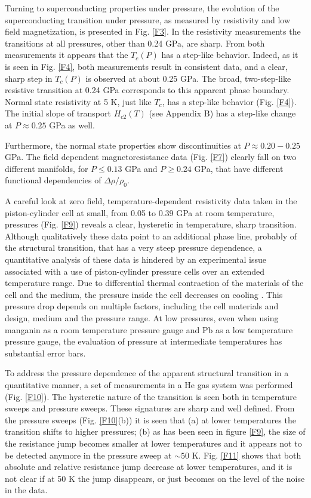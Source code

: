 \documentclass[aps,prb,preprint,groupedaddress,showpacs,amsmath,amssymb]{revtex4}
\begin{document}
Turning to superconducting properties under pressure, the evolution of the superconducting transition under pressure, as measured by resistivity and low field magnetization, is presented in Fig. \ref{F3}. In the resistivity measurements the transitions at all pressures, other than 0.24 GPa, are sharp. From both measurements it appears that the $T_c(P)$  has a step-like behavior. Indeed, as it is seen in Fig. \ref{F4}, both measurements result in consistent data, and a clear, sharp step in $T_c(P)$ is observed at about 0.25 GPa.  The broad, two-step-like resistive transition at 0.24 GPa corresponds to this apparent phase boundary. Normal state resistivity at 5 K, just like $T_c$, has a step-like behavior (Fig. \ref{F4}). The initial slope of transport $H_{c2}(T)$ (see Appendix B) has a step-like change at $P \approx 0.25$ GPa as well.

Furthermore, the normal state properties show discontinuities at $P \approx 0.20-0.25$ GPa. The field dependent magnetoresistance data (Fig. \ref{F7}) clearly fall on two different manifolds, for $P\leq 0.13$ GPa and $P \geq 0.24$ GPa, that have different functional dependencies of $\Delta \rho/\rho_0$. 

A careful look at zero field, temperature-dependent resistivity data taken in the piston-cylinder cell at small, from 0.05 to 0.39 GPa at room temperature, pressures (Fig. \ref{F9}) reveals a clear, hysteretic in temperature, sharp transition. Although qualitatively these data point to an additional phase line, probably of the structural transition, that has a very steep pressure dependence, a quantitative analysis of these data is hindered by an experimental issue associated with a use of piston-cylinder pressure cells over an extended temperature range. Due to differential thermal contraction of the materials of the cell and the medium, the pressure inside the cell decreases on cooling \cite{tho84a}. This pressure drop depends on multiple factors, including the cell materials and design, medium and the pressure range. At low pressures, even when using manganin as a room temperature pressure gauge and Pb as a low temperature pressure gauge, the evaluation of pressure at intermediate temperatures has substantial error bars. 

To address the pressure dependence of the apparent structural transition in a quantitative manner, a set of measurements in a He gas system was performed (Fig. \ref{F10}). The hysteretic nature of the transition is seen both in temperature sweeps and pressure sweeps. These signatures are sharp and well defined. From the pressure sweeps (Fig. \ref{F10}(b))  it is seen that (a) at lower temperatures the transition shifts to higher pressures; (b) as has been seen in figure \ref{F9}, the size of the resistance jump becomes smaller at lower temperatures and it appears not to be detected anymore in the pressure sweep at $\sim 50$ K. Fig. \ref{F11} shows that both absolute and relative resistance jump decrease at lower temperatures, and it is not clear if at 50 K the jump disappears, or just becomes on the level of the noise in the data.
\end{document}

